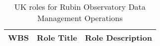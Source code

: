 \normalsize \begin{longtable} {|p{}|p{}|p{}|} \caption{UK roles for Rubin Observatory Data Management Operations \label{tab:ukdfroles}}\\ 
\hline 
\textbf{WBS}&\textbf{Role Title}&\textbf{Role Description} \\ \hline
\end{longtable} \normalsize
